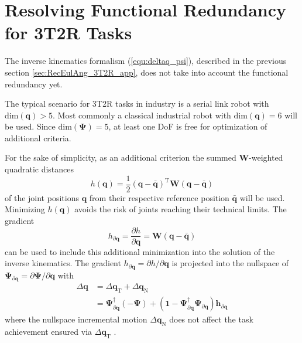 \documentclass{svproc}
\newcommand{\bm}[1]{\boldsymbol{#1}}
\newcommand{\transp}[0]{{\mathrm{T}}}
\begin{document}
\section{Resolving Functional Redundancy for 3T2R Tasks}
\label{sec:ResFuncRed}


The inverse kinematics formalism (\ref{equ:deltaq_psi}), described in the previous section \ref{sec:RecEulAng_3T2R_app}, does not take into account the functional redundancy yet.

The typical scenario for 3T2R tasks in industry is a serial link robot with $\mathrm{dim}(\bm{q})>5$.
Most commonly a classical industrial robot with $\mathrm{dim}(\bm{q})=6$ will be used.
Since $\mathrm{dim}(\bm{\Psi})=5$, at least one DoF is free for optimization of additional criteria.

For the sake of simplicity, as an additional criterion the summed $\bm{W}$-weighted quadratic distances
%
\begin{equation}
h(\bm{q})
=
\frac{1}{2} (\bm{q}-\bar{\bm{q}})^\transp\bm{W}(\bm{q}-\bar{\bm{q}})
\end{equation}  
%
of the joint positions $\bm{q}$ from their respective reference position $\bar{\bm{q}}$ will be used.
Minimizing $h(\bm{q})$ avoids the risk of joints reaching their technical limits.
The gradient
%
\begin{equation}
h_{\partial\bm{q}}
=
\frac{\partial h}{\partial \bm{q}}
=
\bm{W}(\bm{q}-\bar{\bm{q}})
\end{equation}
%
can be used to include this additional minimization into the solution of the inverse kinematics.
The gradient $h_{\partial\bm{q}}=\partial h/\partial \bm{q}$ is projected into the nullspace of $\bm{\Psi}_{\partial\bm{q}}=\partial \bm{\Psi}/\partial \bm{q}$ with
%
\begin{align}
{\Delta}\bm{q}
&=
{\Delta}\bm{q}_{\mathrm{T}} + {\Delta}\bm{q}_{\mathrm{N}} \nonumber \\
&=
\bm{\Psi}_{\partial\bm{q}}^{\dagger} (-\bm{\Psi}) +  (\bm{1}-\bm{\Psi}_{\partial\bm{q}}^{\dagger}\bm{\Psi}_{\partial\bm{q}}) \bm{h}_{\partial\bm{q}}
\label{equ:nullspace}
\end{align}
%
where the nullspace incremental motion ${\Delta}\bm{q}_{\mathrm{N}}$ does not affect the task achievement ensured via ${\Delta}\bm{q}_{\mathrm{T}}$ \cite{Yoshikawa1984}.
\end{document}
